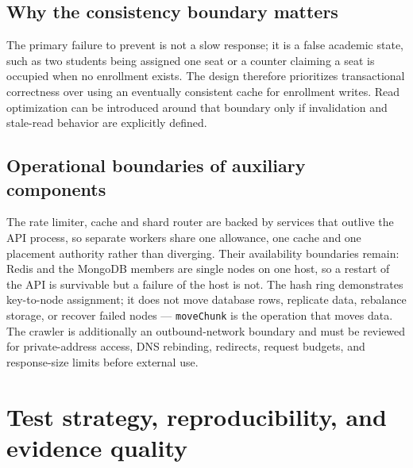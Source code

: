 \documentclass[11pt,a4paper,oneside]{report}
\begin{document}
\section{Why the consistency boundary matters}
The primary failure to prevent is not a slow response; it is a false academic state, such as two students being assigned one seat or a counter claiming a seat is occupied when no enrollment exists. The design therefore prioritizes transactional correctness over using an eventually consistent cache for enrollment writes. Read optimization can be introduced around that boundary only if invalidation and stale-read behavior are explicitly defined.

\section{Operational boundaries of auxiliary components}
The rate limiter, cache and shard router are backed by services that outlive the API process, so separate workers share one allowance, one cache and one placement authority rather than diverging. Their availability boundaries remain: Redis and the MongoDB members are single nodes on one host, so a restart of the API is survivable but a failure of the host is not. The hash ring demonstrates key-to-node assignment; it does not move database rows, replicate data, rebalance storage, or recover failed nodes — \texttt{moveChunk} is the operation that moves data. The crawler is additionally an outbound-network boundary and must be reviewed for private-address access, DNS rebinding, redirects, request budgets, and response-size limits before external use.

\chapter{Test strategy, reproducibility, and evidence quality}
\end{document}
